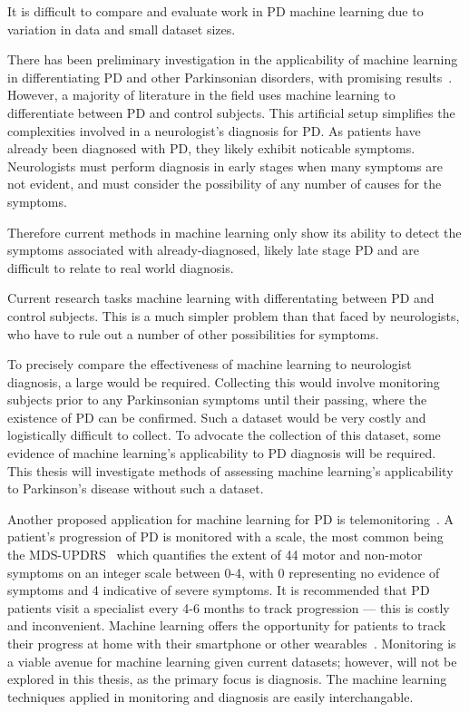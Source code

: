 \documentclass[12pt, twoside]{book}
\renewcommand\emph[1]{\textit{\color{USred}{#1}}}
\begin{document}
\begin{highlight}
It is difficult to compare and evaluate work in PD machine learning due to variation in data and small dataset sizes.
\end{highlight}

There has been preliminary investigation in the applicability of machine learning in differentiating PD and other Parkinsonian disorders, with promising results~\cite{esser2011assessment, PDessentialtremordifferentiation}. However, a majority of literature in the field uses machine learning to differentiate between PD and control subjects. This artificial setup simplifies the complexities involved in a neurologist's diagnosis for PD. As patients have already been diagnosed with PD, they likely exhibit noticable symptoms. Neurologists must perform diagnosis in early stages when many symptoms are not evident, and must consider the possibility of any number of causes for the symptoms. 

Therefore current methods in machine learning only show its ability to detect the symptoms associated with already-diagnosed, likely late stage PD and are difficult to relate to real world diagnosis. 

\begin{highlight}
Current research tasks machine learning with differentating between PD and control subjects. This is a much simpler problem than that faced by neurologists, who have to rule out a number of other possibilities for symptoms.
\end{highlight}

To precisely compare the effectiveness of machine learning to neurologist diagnosis, a large \emph{longitudinal dataset} would be required. Collecting this would involve monitoring subjects prior to any Parkinsonian symptoms until their passing, where the existence of PD can be confirmed. Such a dataset would be very costly and logistically difficult to collect. To advocate the collection of this dataset, some evidence of machine learning's applicability to PD diagnosis will be required. This thesis will investigate methods of assessing machine learning's applicability to Parkinson's disease without such a dataset.  

Another proposed application for machine learning for PD is telemonitoring~\cite{splittledysphonia2009, sptsanastelemonitor2010}. A patient's progression of PD is monitored with a scale, the most common being the MDS-UPDRS~\cite{updrs} which quantifies the extent of 44 motor and non-motor symptoms on an integer scale between 0-4, with 0 representing no evidence of symptoms and 4 indicative of severe symptoms. It is recommended that PD patients visit a specialist every 4-6 months to track progression --- this is costly and inconvenient. Machine learning offers the opportunity for patients to track their progress at home with their smartphone or other wearables~\cite{cancela2016monitoring}. Monitoring is a viable avenue for machine learning given current datasets; however, will not be explored in this thesis, as the primary focus is diagnosis. The machine learning techniques applied in monitoring and diagnosis are easily interchangable.
\end{document}
